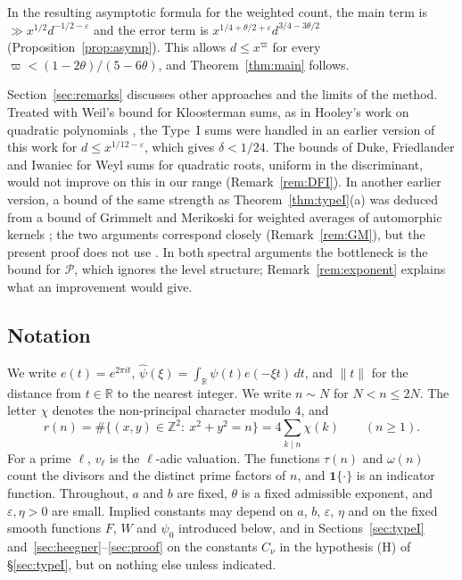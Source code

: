 \documentclass[11pt]{amsart}
\theoremstyle{remark}
\theoremstyle{definition}
\numberwithin{equation}{section}
\newcommand{\Pc}{\mathcal{P}}
\newcommand{\Z}{\mathbb{Z}}
\newcommand{\R}{\mathbb{R}}
\newcommand{\eps}{\varepsilon}
\newcommand{\one}{\mathbf{1}}
\begin{document}
In the resulting asymptotic formula for the weighted count, the main term is $\gg x^{1/2}d^{-1/2-\eps}$ and the error term is $x^{1/4+\theta/2+\eps}d^{3/4-3\theta/2}$ (Proposition~\ref{prop:asymp}). This allows $d\le x^{\varpi}$ for every $\varpi<(1-2\theta)/(5-6\theta)$, and Theorem~\ref{thm:main} follows.

Section~\ref{sec:remarks} discusses other approaches and the limits of the method. Treated with Weil's bound for Kloosterman sums, as in Hooley's work on quadratic polynomials \cite{Ho63}, the Type~I sums were handled in an earlier version of this work for $d\le x^{1/12-\eps}$, which gives $\delta<1/24$. The bounds of Duke, Friedlander and Iwaniec \cite{DFI12} for Weyl sums for quadratic roots, uniform in the discriminant, would not improve on this in our range (Remark~\ref{rem:DFI}). In another earlier version, a bound of the same strength as Theorem~\ref{thm:typeI}(a) was deduced from a bound of Grimmelt and Merikoski for weighted averages of automorphic kernels \cite[Theorem~8.1]{GM1}; the two arguments correspond closely (Remark~\ref{rem:GM}), but the present proof does not use \cite{GM1}. In both spectral arguments the bottleneck is the bound for $\Pc$, which ignores the level structure; Remark~\ref{rem:exponent} explains what an improvement would give.

\subsection{Notation}
We write $e(t)=e^{2\pi it}$, $\hat\psi(\xi)=\int_\R\psi(t)e(-\xi t)\,dt$, and $\|t\|$ for the distance from $t\in\R$ to the nearest integer. We write $n\sim N$ for $N<n\le2N$. The letter $\chi$ denotes the non-principal character modulo $4$, and
\[
r(n)=\#\{(x,y)\in\Z^2:\ x^2+y^2=n\}=4\sum_{k\mid n}\chi(k)\qquad(n\ge1).
\]
For a prime $\ell$, $v_\ell$ is the $\ell$-adic valuation. The functions $\tau(n)$ and $\omega(n)$ count the divisors and the distinct prime factors of $n$, and $\one\{\cdot\}$ is an indicator function. Throughout, $a$ and $b$ are fixed, $\theta$ is a fixed admissible exponent, and $\eps,\eta>0$ are small. Implied constants may depend on $a$, $b$, $\eps$, $\eta$ and on the fixed smooth functions $F$, $W$ and $\psi_0$ introduced below, and in Sections~\ref{sec:typeI} and~\ref{sec:heegner}--\ref{sec:proof} on the constants $C_\nu$ in the hypothesis \textup{(H)} of \S\ref{sec:typeI}, but on nothing else unless indicated.
\end{document}
